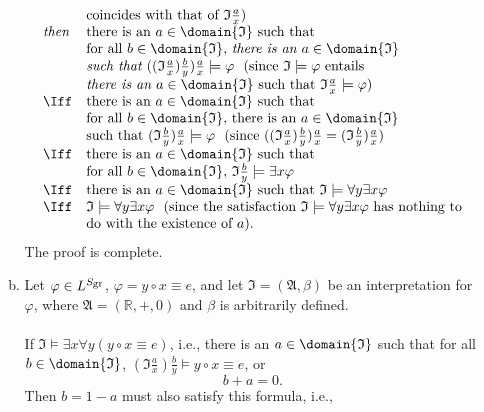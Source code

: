 \begin{enumerate}[1.]
\begin{enumerate}[(a)]
\[\begin{array}{ll}
\,  & \mbox{coincides with that of $\mathfrak{I} \frac{a}{x}$)} \\
\mbox{\it then} & \mbox{there is an $a \in \domain{\mathfrak{I}}$ such that } \\
\,  & \mbox{for all $b \in \domain{\mathfrak{I}}$, \it there is an \rm $a \in \domain{\mathfrak{I}}$} \\
\,  & \mbox{\it such that } ((\mathfrak{I} \frac{a}{x}) \frac{b}{y}) \frac{a}{x} \models \varphi \mbox{\ \ (since $\mathfrak{I} \models \varphi$ entails} \\
\,  & \mbox{\it there is an \rm $a \in \domain{\mathfrak{I}}$ such that $\mathfrak{I} \frac{a}{x} \models \varphi$)} \\
\Iff & \mbox{there is an $a \in \domain{\mathfrak{I}}$ such that } \\
\,  & \mbox{for all $b \in \domain{\mathfrak{I}}$, there is an $a \in \domain{\mathfrak{I}}$} \\
\,  & \mbox{such that } (\mathfrak{I} \frac{b}{y}) \frac{a}{x} \models \varphi \mbox{\ \ (since $((\mathfrak{I} \frac{a}{x}) \frac{b}{y}) \frac{a}{x} = (\mathfrak{I} \frac{b}{y}) \frac{a}{x}$)} \\
\Iff & \mbox{there is an $a \in \domain{\mathfrak{I}}$ such that} \\
\,  & \mbox{for all $b \in \domain{\mathfrak{I}}$, $\mathfrak{I} \frac{b}{y} \models \exists x \varphi$} \\
\Iff & \mbox{there is an $a \in \domain{\mathfrak{I}}$ such that $\mathfrak{I} \models \forall y \exists x \varphi$} \\
\Iff & \mathfrak{I} \models \forall y \exists x \varphi \mbox{\ \ (since the satisfaction $\mathfrak{I} \models \forall y \exists x \varphi$ has nothing to} \\
\,  & \mbox{do with the existence of $a$)}. 
\end{array}
\]
The proof is complete.
\item Let $\varphi \in L^{S_{\mbox{\scriptsize gr}}}$, $\varphi = y \circ x \equiv e$, and let $\mathfrak{I} = (\mathfrak{A}, \beta)$ be an interpretation for $\varphi$, where $\mathfrak{A} = (\mathbb{R}, +, 0)$ and $\beta$ is arbitrarily defined.\\
\ 
\\If $\mathfrak{I} \models \exists x \forall y ( y \circ x \equiv e )$, i.e., there is an $a \in \domain{\mathfrak{I}}$ such that for all $b \in \domain{\mathfrak{I}}$, $( \mathfrak{I} \frac{a}{x} ) \frac{b}{y} \models y \circ x \equiv e$, or
\[
b + a = 0.
\]
Then $b = 1-a$ must also satisfy this formula, i.e.,

\end{enumerate}
\end{enumerate}
